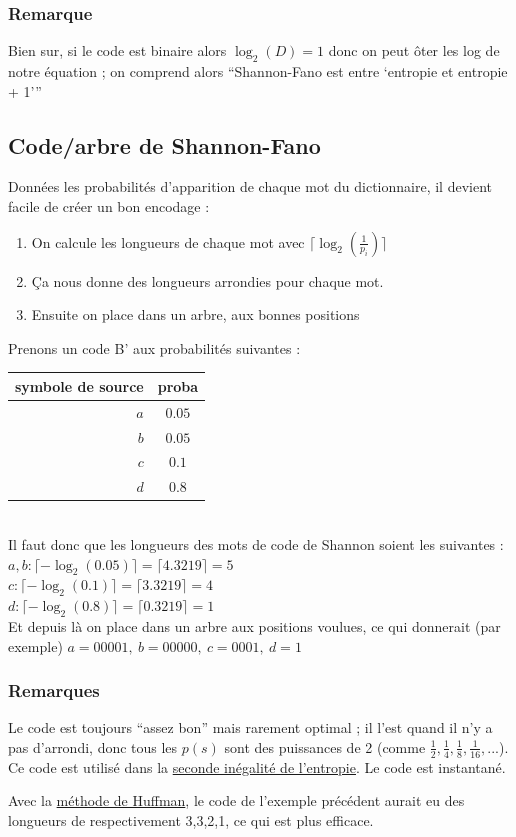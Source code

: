\documentclass[11pt,a4paper]{article}
\renewcommand{\)}{\right)}
\renewcommand{\(}{\left(}
\begin{document}
\subsubsection{Remarque}
Bien sur, si le code est binaire alors $\log_2(D) = 1$ donc on peut ôter les log de notre équation ; on comprend alors \enquote{Shannon-Fano est entre \enquote{entropie et entropie + 1}}
\subsection{Code/arbre de Shannon-Fano}
\label{shannon}
Données les probabilités d'apparition de chaque mot du dictionnaire, il devient facile de créer un bon encodage :
\begin{enumerate}
	\item On calcule les longueurs de chaque mot avec $\lceil \log_2\left(\frac{1}{p_i}\right)\rceil$
	\item Ça nous donne des longueurs arrondies pour chaque mot.
	\item Ensuite on place dans un arbre, aux bonnes positions
\end{enumerate}
\begin{exemple}
	Prenons un code B' aux probabilités suivantes :
	\begin{tabular}{r|c}
	\hline
	symbole de source & proba\\
	\hline
	$a$ & $0.05$\\
	$b$ & $0.05$\\
	$c$ & $0.1$\\
	$d$ & $0.8$\\
	\hline
	\end{tabular}\\
	Il faut donc que les longueurs des mots de code de Shannon soient les suivantes :  \\
	$a,b : \lceil-\log_2(0.05)\rceil = \lceil4.3219\rceil = 5$\\
	$c : \lceil-\log_2(0.1)\rceil = \lceil3.3219\rceil = 4$\\
	$d : \lceil-\log_2(0.8)\rceil = \lceil0.3219\rceil = 1$\\
	Et depuis là on place dans un arbre aux positions voulues, ce qui donnerait (par exemple) $a = 00001,\ b = 00000,\ c = 0001,\ d = 1$
\end{exemple}

\subsubsection{Remarques} Le code est toujours \enquote{assez bon} mais rarement optimal ; il l'est quand il n'y a pas d'arrondi, donc tous les $p(s)$ sont des puissances de 2 (comme $\frac{1}{2},\frac{1}{4},\frac{1}{8},\frac{1}{16},...$). Ce code est utilisé dans la \hyperref[seconde inegalite entropie]{seconde inégalité de l'entropie}. Le code est instantané.
\begin{exemple}
	Avec la \hyperref[code huffman]{méthode de Huffman}, le code de l'exemple précédent aurait eu des longueurs de respectivement 3,3,2,1, ce qui est plus efficace.
\end{exemple}
\end{document}
